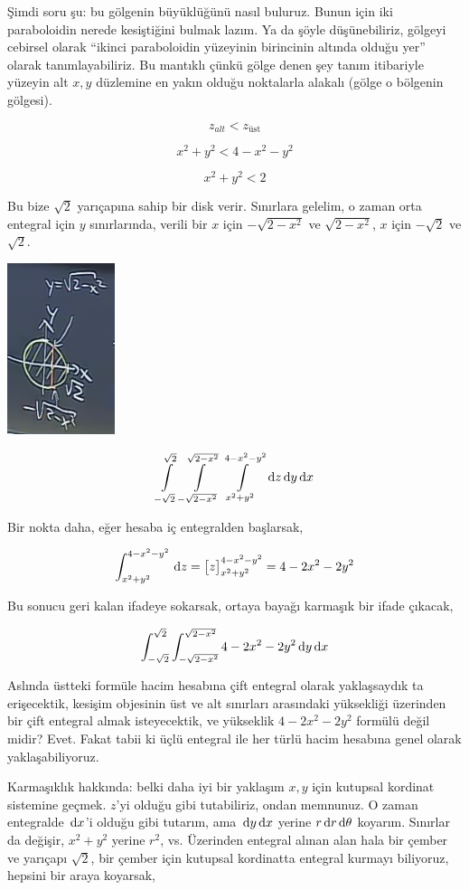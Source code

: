\documentclass[12pt,fleqn]{article}\usepackage{../../common}
\begin{document}
Şimdi soru şu: bu gölgenin büyüklüğünü nasıl buluruz. Bunun için iki
paraboloidin nerede kesiştiğini bulmak lazım. Ya da şöyle düşünebiliriz,
gölgeyi cebirsel olarak ``ikinci paraboloidin yüzeyinin birincinin altında
olduğu yer'' olarak tanımlayabiliriz. Bu mantıklı çünkü gölge denen şey
tanım itibariyle yüzeyin alt $x,y$ düzlemine en yakın olduğu noktalarla
alakalı (gölge o bölgenin gölgesi).

$$ z_{alt} < z_{\textrm{üst}} $$

$$ x^2 + y^2 < 4 - x^2 -y^2 $$

$$ x^2 + y^2 < 2 $$

Bu bize $\sqrt{2}$ yarıçapına sahip bir disk verir. Sınırlara gelelim, o
zaman orta entegral için $y$ sınırlarında, verili bir $x$ için
$-\sqrt{2-x^2}$ ve $\sqrt{2-x^2}$, $x$ için $-\sqrt{2}$ ve $\sqrt{2}$.

\includegraphics[height=5cm]{25_7.png}

$$ 
\int\limits_{-\sqrt{2}}^{\sqrt{2}}
\int\limits_{-\sqrt{2-x^2}}^{\sqrt{2-x^2}} 
\int\limits_{x^2+y^2}^{4-x^2-y^2} 
\,\mathrm{d} z \,\mathrm{d} y \,\mathrm{d} x
$$

Bir nokta daha, eğer hesaba iç entegralden başlarsak, 

$$ 
\int_{x^2+y^2}^{4-x^2-y^2} \,\mathrm{d} z = 
\big[ z \big]_{x^2+y^2}^{4-x^2-y^2} = 
4-2x^2-2y^2
$$

Bu sonucu geri kalan ifadeye sokarsak, ortaya bayağı karmaşık bir ifade
çıkacak, 

$$ 
\int_{-\sqrt{2}}^{\sqrt{2}} \int_{-\sqrt{2-x^2}}^{\sqrt{2-x^2}} 
4-2x^2-2y^2 \,\mathrm{d} y \,\mathrm{d} x
$$

Aslında üstteki formüle hacim hesabına çift entegral olarak yaklaşsaydık ta
erişecektik, kesişim objesinin üst ve alt sınırları arasındaki yüksekliği
üzerinden bir çift entegral almak isteyecektik, ve yükseklik $4-2x^2-2y^2$
formülü değil midir? Evet. Fakat tabii ki üçlü entegral ile her türlü hacim
hesabına genel olarak yaklaşabiliyoruz.

Karmaşıklık hakkında: belki daha iyi bir yaklaşım $x,y$ için kutupsal
kordinat sistemine geçmek. $z$'yi olduğu gibi tutabiliriz, ondan
memnunuz. O zaman entegralde $\,\mathrm{d} x$'i olduğu gibi tutarım, ama
$\,\mathrm{d} y \,\mathrm{d} x$ yerine $r \,\mathrm{d} r \,\mathrm{d}\theta$ koyarım. Sınırlar da değişir,
$x^2+y^2$ yerine $r^2$, vs. Üzerinden entegral alınan alan hala bir çember
ve yarıçapı $\sqrt{2}$, bir çember için kutupsal kordinatta entegral
kurmayı biliyoruz, hepsini bir araya koyarsak,
\end{document}
